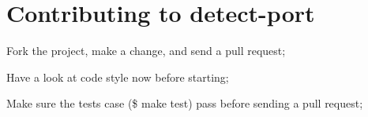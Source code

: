 \chapter{Contributing to detect-\/port}
\hypertarget{md_pkiclassroomrescheduler_2src_2main_2frontend_2node__modules_2detect-port-alt_2_c_o_n_t_r_i_b_u_t_i_n_g}{}\label{md_pkiclassroomrescheduler_2src_2main_2frontend_2node__modules_2detect-port-alt_2_c_o_n_t_r_i_b_u_t_i_n_g}
\label{md_pkiclassroomrescheduler_2src_2main_2frontend_2node__modules_2detect-port-alt_2_c_o_n_t_r_i_b_u_t_i_n_g_autotoc_md8524}%
%

\begin{DoxyItemize}
\item Fork the project, make a change, and send a pull request;
\item Have a look at code style now before starting;
\item Make sure the tests case ({\ttfamily \$ make test}) pass before sending a pull request; 
\end{DoxyItemize}